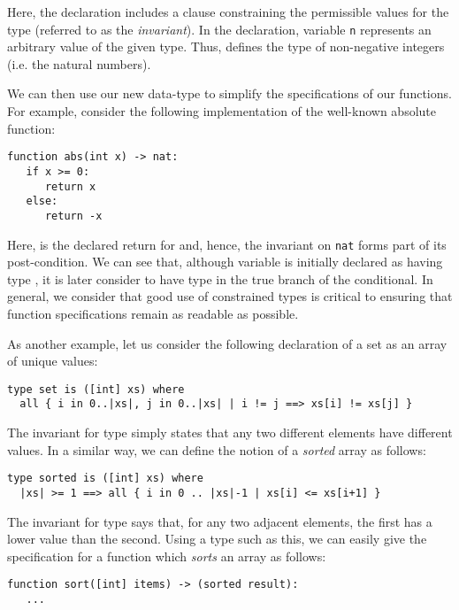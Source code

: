 Here, the  declaration includes a  clause constraining the permissible values for the type (referred to as the {\em invariant}).  In the declaration, variable \lstinline{n} represents an arbitrary value of the given type.  Thus,  defines the type of non-negative integers (i.e. the natural numbers).

We can then use our new data-type to simplify the specifications of our functions.  For example, consider the following implementation of the well-known absolute function:

\begin{lstlisting}
function abs(int x) -> nat:
   if x >= 0:
      return x
   else:
      return -x
\end{lstlisting}

Here,  is the declared return for  and, hence, the invariant on \lstinline{nat} forms part of its post-condition.  We can see that, although variable  is initially declared as having type , it is later consider to have type  in the true branch of the conditional.  In general, we consider that good use of constrained types is critical to ensuring that function specifications remain as readable as possible.

As another example, let us consider the following declaration of a set as an array of unique values:

\begin{lstlisting}
type set is ([int] xs) where 
  all { i in 0..|xs|, j in 0..|xs| | i != j ==> xs[i] != xs[j] }
\end{lstlisting}

The invariant for type  simply states that any two different elements have different values.  In a similar way, we can define the notion of a {\em sorted} array as follows:

\begin{lstlisting}
type sorted is ([int] xs) where 
  |xs| >= 1 ==> all { i in 0 .. |xs|-1 | xs[i] <= xs[i+1] }
\end{lstlisting} 

The invariant for type  says that, for any two adjacent elements, the first has a lower value than the second.  Using a type such as this, we can easily give the specification for a function which {\em sorts} an array as follows:

\begin{lstlisting}
function sort([int] items) -> (sorted result):
   ...
\end{lstlisting}

